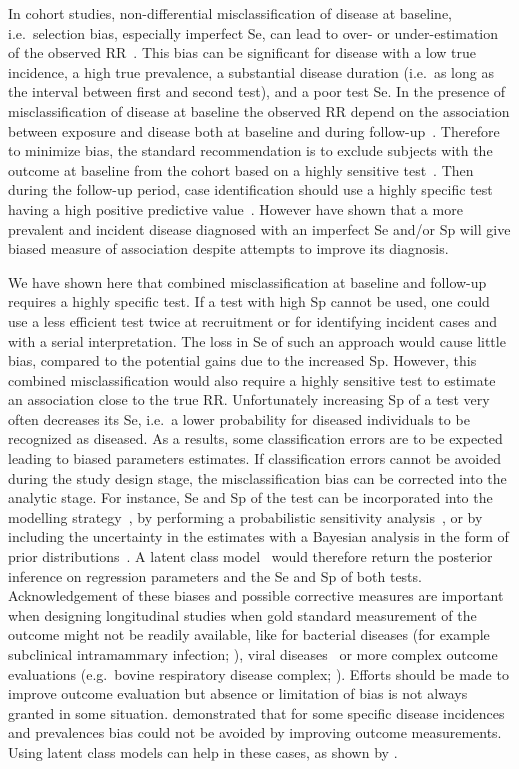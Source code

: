 In cohort studies, non-differential misclassification of disease at baseline,
i.e.\ selection bias, especially imperfect Se, can lead to over- or
under-estimation of the observed RR~\citep{Pekkanen2006}.
This bias can be significant for disease with a low true incidence, a high true
prevalence, a substantial disease duration (i.e.\ as long as the interval between
first and second test), and a poor test Se.
In the presence of misclassification of disease at baseline the observed RR
depend on the association between exposure and disease both at baseline and
during follow-up~\citep{Pekkanen2006}.
Therefore to minimize bias, the standard recommendation is to exclude subjects
with the outcome at baseline from the cohort based on a highly sensitive
test~\citep{Pekkanen2008}.
Then during the follow-up period, case identification should use a highly
specific test having a high positive predictive value~\citep{Brenner1993}.
However \cite{Haine2017} have shown that a more prevalent and incident disease
diagnosed with an imperfect Se and/or Sp will give biased measure of association
despite attempts to improve its diagnosis.

We have shown here that combined misclassification at baseline and follow-up
requires a highly specific test.
If a test with high Sp cannot be used, one could use a less efficient test twice
at recruitment or for identifying incident cases and with a serial
interpretation.
The loss in Se of such an approach would cause little bias, compared to the
potential gains due to the increased Sp.
However, this combined misclassification would also require a highly sensitive
test to estimate an association close to the true RR.
Unfortunately increasing Sp of a test very often decreases its Se, i.e.\ a lower
probability for diseased individuals to be recognized as diseased.
As a results, some classification errors are to be expected leading to biased
parameters estimates.
If classification errors cannot be avoided during the study design stage, the
misclassification bias can be corrected into the analytic stage.
For instance, Se and Sp of the test can be incorporated into the modelling
strategy~\citep{Magder1997}, by performing a probabilistic sensitivity
analysis~\citep{Fox_2005}, or by including the uncertainty in the estimates with
a Bayesian analysis in the form of prior distributions~\citep{McInturff2004}.
A latent class model~\citep{Hui1980} would therefore return the posterior
inference on regression parameters and the Se and Sp of both tests.
Acknowledgement of these biases and possible corrective measures are important
when designing longitudinal studies when gold standard measurement of the
outcome might not be readily available, like for bacterial diseases (for example
subclinical intramammary infection; \citealp{Koop2013}), viral
diseases~\citep{Dotti2013} or more complex outcome evaluations (e.g.\ bovine
respiratory disease complex; \citealp{Buczinski2015}).
Efforts should be made to improve outcome evaluation but absence or limitation of
bias is not always granted in some situation.
\cite{Haine2017} demonstrated that for some specific disease incidences and
prevalences bias could not be avoided by improving outcome measurements.
Using latent class models can help in these cases, as shown by
\cite{Dufour2012}.

